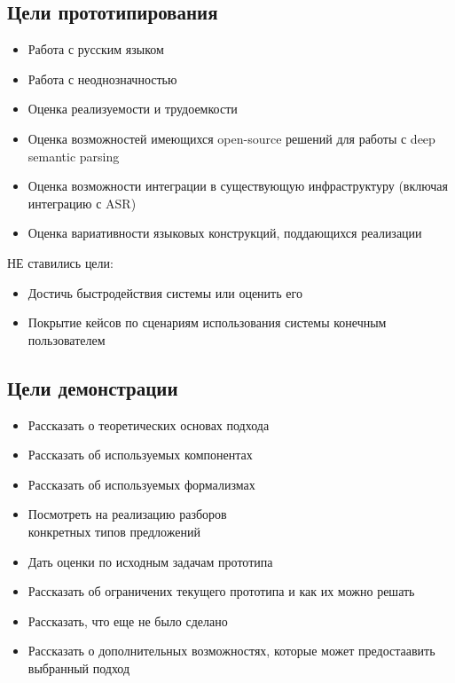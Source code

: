\documentclass[a4paper,12pt]{article}
\begin{document}
\subsection{Цели прототипирования}

\begin{itemize}
	\item Работа с русским языком
	\item Работа с неоднозначностью
	\item Оценка реализуемости и трудоемкости
	\item Оценка возможностей имеющихся open-source решений для работы с deep semantic parsing
	\item Оценка возможности интеграции в существующую инфраструктуру (включая интеграцию с ASR)
	\item Оценка вариативности языковых конструкций, поддающихся реализации
\end{itemize}

НЕ ставились цели:\\
\begin{itemize}
	\item Достичь быстродействия системы или оценить его
	\item Покрытие кейсов по сценариям использования системы конечным пользователем
\end{itemize}

\subsection{Цели демонстрации}
\begin{itemize}
	\item Рассказать о теоретических основах подхода
	\item Рассказать об используемых компонентах
	\item Рассказать об используемых формализмах
	\item Посмотреть на реализацию разборов \\конкретных типов предложений
	\item Дать оценки по исходным задачам прототипа
	\item Рассказать об ограничених текущего прототипа и как их можно решать
	\item Рассказать, что еще не было сделано
	\item Рассказать о дополнительных возможностях, которые может предостаавить выбранный подход
\end{itemize}
\end{document}
